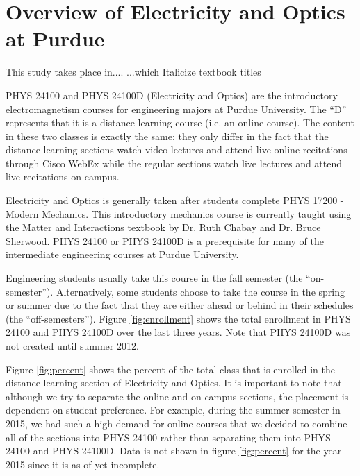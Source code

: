 
\section{Overview of Electricity and Optics at Purdue}

This study takes place in.... ...which
Italicize textbook titles

PHYS 24100 and PHYS 24100D (Electricity and Optics) are the introductory electromagnetism courses for engineering majors at Purdue University. The ``D'' represents that it is a distance learning course (i.e. an online course). The content in these two classes is exactly the same; they only differ in the fact that the distance learning sections watch video lectures and attend live online recitations through Cisco WebEx while the regular sections watch live lectures and attend live recitations on campus.

Electricity and Optics is generally taken after students complete PHYS 17200 - Modern Mechanics. This introductory mechanics course is currently taught using the Matter and Interactions textbook by Dr. Ruth Chabay and Dr. Bruce Sherwood\cite{chabay2010}. PHYS 24100 or PHYS 24100D is a prerequisite for many of the intermediate engineering courses at Purdue University.

Engineering students usually take this course in the fall semester (the ``on-semester''). Alternatively, some students choose to take the course in the spring or summer due to the fact that they are either ahead or behind in their schedules (the ``off-semesters''). Figure \ref{fig:enrollment} shows the total enrollment in PHYS 24100 and PHYS 24100D over the last three years. Note that PHYS 24100D was not created until summer 2012.

Figure \ref{fig:percent} shows the percent of the total class that is enrolled in the distance learning section of Electricity and Optics. It is important to note that although we try to separate the online and on-campus sections, the placement is dependent on student preference. For example, during the summer semester in 2015, we had such a high demand for online courses that we decided to combine all of the sections into PHYS 24100 rather than separating them into PHYS 24100 and PHYS 24100D. Data is not shown in figure \ref{fig:percent} for the year 2015 since it is as of yet incomplete.


